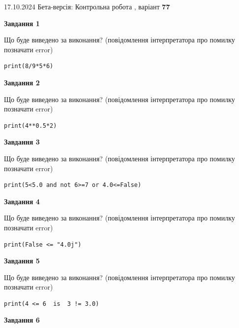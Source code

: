 \documentclass[12pt, ukrainian]{article}
\begin{document}
{\Large{17.10.2024 Бета-версія: Контрольна робота , варіант  \No \textbf { 77 }\par}}
{
\begin {large}
{\begin {center}\textbf{Завдання 1}\end {center}}

Що буде виведено за виконання? (повідомлення інтерпретатора про помилку позначати error)\par
\begin{verbatim}
print(8/9*5*6)
\end{verbatim}

{\begin {center}\textbf{Завдання 2}\end {center}}

Що буде виведено за виконання? (повідомлення інтерпретатора про помилку позначати error)\par
\begin{verbatim}
print(4**0.5*2)
\end{verbatim}

{\begin {center}\textbf{Завдання 3}\end {center}}

Що буде виведено за виконання? (повідомлення інтерпретатора про помилку позначати error)\par
\begin{verbatim}
print(5<5.0 and not 6>=7 or 4.0<=False)
\end{verbatim}

{\begin {center}\textbf{Завдання 4}\end {center}}

Що буде виведено за виконання? (повідомлення інтерпретатора про помилку позначати error)\par
\begin{verbatim}
print(False <= "4.0j")
\end{verbatim}

{\begin {center}\textbf{Завдання 5}\end {center}}

Що буде виведено за виконання? (повідомлення інтерпретатора про помилку позначати error)\par
\begin{verbatim}
print(4 <= 6  is  3 != 3.0)
\end{verbatim}

{\begin {center}\textbf{Завдання 6}\end {center}}


\end{large}}
\end{document}
